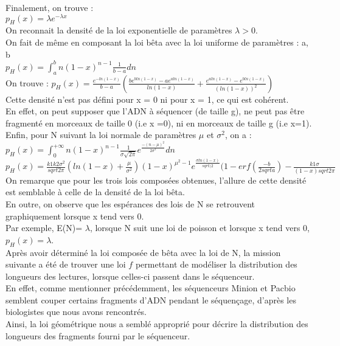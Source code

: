 \documentclass[11pt,a4paper]{article} %
\begin{document}
Finalement, on trouve : \\
$p_{H}(x) = \lambda e^{-\lambda x}$ \\
On reconnait la densité de la loi exponentielle de paramètres $\lambda > 0$. \\
On fait de même en composant la loi bêta avec la loi uniforme de paramètres : a, b \\
$p_{H}(x) = \int_{a}^{b}n(1-x)^{n-1}\frac{1}{b-a}dn$\\
On trouve : $ p_{H}(x)=\frac{e^{-ln(1-x)}}{b-a}(\frac{be^{bln(1-x)}-ae^{aln(1-x)}}{ln(1-x)}+ \frac{e^{aln(1-x)}-e^{bln(1-x)}}{(ln(1-x))^2})$\\
Cette densité n'est pas défini pour x = 0 ni pour x = 1, ce qui est cohérent. \\
En effet, on peut supposer que l'ADN à séquencer (de taille g), ne peut pas être fragmenté en morceaux de taille 0 (i.e x =0), ni en morceaux de taille g (i.e x=1). \\ 
Enfin, pour N suivant la loi normale de paramètres $\mu$ et $\sigma^2$, on a : \\
$p_{H}(x) = \int_{0}^{+\infty}n(1-x)^{n-1}\frac{1}{\sigma\sqrt{2\pi}}e^{\frac{-(n-\mu)^2}{2\sigma^2}}dn$ \\
$p_{H}(x)=\frac{k1k2\sigma^2}{sqrt{2\pi}}(ln(1-x)+\frac{\mu}{\sigma^2})(1-x)^{\mu^2 - 1}e^{\frac{\sigma ln(1-x)}{sqrt(2}}(1-erf(\frac{-b}{2sqrt{a}})-\frac{k1\sigma}{(1-x)sqrt{2\pi}}$ \\
On remarque que pour les trois lois composées obtenues, l'allure de cette densité est semblable à celle de la densité de la loi bêta. \\
En outre, on observe que les espérances des lois de N se retrouvent graphiquement lorsque x tend vers 0.\\
Par exemple, E(N)= $\lambda$, lorsque N suit une loi de poisson et lorsque x tend vers 0, $p_{H}(x)= \lambda$. \\
Après avoir déterminé la loi composée de bêta avec la loi de N, la mission suivante a été de trouver une loi $f$ permettant de modéliser la distribution des longueurs des lectures, lorsque celles-ci passent dans le séquenceur. \\
En effet, comme mentionner précédemment, les séquenceurs Minion et Pacbio semblent couper certains fragments d'ADN pendant le séquençage, d'après les biologistes que nous avons rencontrés.\\
Ainsi, la loi géométrique nous a semblé approprié pour décrire la distribution des longueurs des fragments fourni par le séquenceur. 
\end{document}
